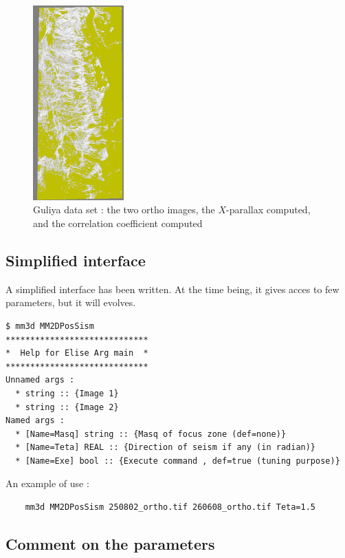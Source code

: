 \begin{figure}
\begin{center}
\includegraphics[width=35mm]{FIGS/SeismGuylia/Correl.jpg} %

\end{center}
\caption{Guliya data set : the two ortho images, the $X$-parallax computed, and the correlation
coefficient computed}
\label{FIG:OK:Guylia}
\end{figure}


\subsection{Simplified interface}

A simplified interface has been written. At the time being, it gives acces to few parameters, but 
it will evolves.

\begin{verbatim}
$ mm3d MM2DPosSism
*****************************
*  Help for Elise Arg main  *
*****************************
Unnamed args : 
  * string :: {Image 1}
  * string :: {Image 2}
Named args : 
  * [Name=Masq] string :: {Masq of focus zone (def=none)}
  * [Name=Teta] REAL :: {Direction of seism if any (in radian)}
  * [Name=Exe] bool :: {Execute command , def=true (tuning purpose)}
\end{verbatim}

An example of use :

\begin{verbatim}
    mm3d MM2DPosSism 250802_ortho.tif 260608_ortho.tif Teta=1.5
\end{verbatim}


\subsection{Comment on the parameters}

